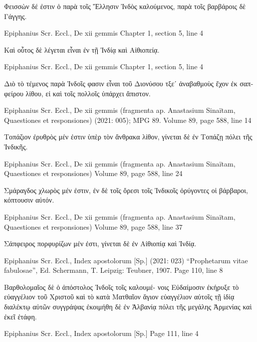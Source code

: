 \documentclass[12pt,letterpaper,twoside,final]{memoir}
\begin{document}
\begin{greek}
                                                                                              Φεισσὼν 
δέ ἐστιν ὁ παρὰ τοῖς Ἕλλησιν Ἰνδὸς καλούμενος, παρὰ τοῖς βαρβάροις δὲ Γάγγης. 



Epiphanius Scr. Eccl., De xii gemmis 
Chapter 1, section 5, line 4

                                                      Καὶ οὗτος δὲ λέγεται εἶναι ἐν τῇ 
Ἰνδίᾳ καὶ Αἰθιοπείᾳ. 



Epiphanius Scr. Eccl., De xii gemmis 
Chapter 1, section 5, line 4

                              Διὸ τὸ τέμενος παρὰ Ἰνδοῖς φασιν εἶναι τοῦ Διονύσου τξεʹ 
ἀναβαθμοὺς ἔχον ἐκ σαπφείρου λίθου, εἰ καὶ τοῖς πολλοῖς ὑπάρχει ἄπιστον. 



Epiphanius Scr. Eccl., De xii gemmis (fragmenta ap. Anastasium Sinaïtam, Quaestiones et responsiones) (2021: 005); MPG 89.
Volume 89, page 588, line 14

Τοπάζιον ἐρυθρὸς μέν ἐστιν ὑπὲρ τὸν ἄνθρακα 
λίθον, γίνεται δὲ ἐν Τοπάζῃ πόλει τῆς Ἰνδικῆς. 



Epiphanius Scr. Eccl., De xii gemmis (fragmenta ap. Anastasium Sinaïtam, Quaestiones et responsiones) 
Volume 89, page 588, line 24

Σμάραγδος χλωρὸς μέν ἐστιν, ἐν δὲ τοῖς ὄρεσι 
τοῖς Ἰνδικοῖς ὀρύγοντες οἱ βάρβαροι, κόπτουσιν 
αὐτόν. 



Epiphanius Scr. Eccl., De xii gemmis (fragmenta ap. Anastasium Sinaïtam, Quaestiones et responsiones) 
Volume 89, page 588, line 37

Σάπφειρος πορφυρίζων μέν ἐστι, γίνεται δὲ 
ἐν Αἰθιοπίᾳ καὶ Ἰνδίᾳ. 



Epiphanius Scr. Eccl., Index apostolorum [Sp.] (2021: 023)
“Prophetarum vitae fabulosae”, Ed. Schermann, T.
Leipzig: Teubner, 1907.
Page 110, line 8

      Βαρθολομαῖος δὲ ὁ ἀπόστολος Ἰνδοῖς τοῖς καλουμέ-
νοις Εὐδαίμοσιν ἐκήρυξε τὸ εὐαγγέλιον τοῦ Χριστοῦ καὶ τὸ 
κατὰ Ματθαῖον ἅγιον εὐαγγέλιον αὐτοῖς τῇ ἰδίᾳ διαλέκτῳ 
αὐτῶν συγγράψας ἐκοιμήθη δὲ ἐν Ἀλβανίᾳ πόλει τῆς μεγάλης 
Ἀρμενίας καὶ ἐκεῖ ἐτάφη. 



Epiphanius Scr. Eccl., Index apostolorum [Sp.] 
Page 111, line 4


\end{greek}
\end{document}
